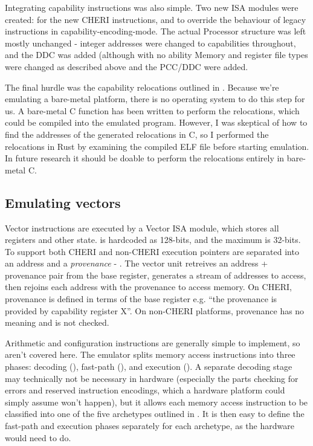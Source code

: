 
Integrating capability instructions was also simple.
Two new ISA modules were created:  for the new CHERI instructions, and  to override the behaviour of legacy instructions in capability-encoding-mode.
The actual Processor structure was left mostly unchanged - integer addresses were changed to capabilities throughout, and the DDC was added (although with no ability 
Memory and register file types were changed as described above and the PCC/DDC were added.

The final hurdle was the capability relocations outlined in .
Because we're emulating a bare-metal platform, there is no operating system to do this step for us.
A bare-metal C function has been written to perform the relocations, which could be compiled into the emulated program.
However, I was skeptical of how to find the addresses of the generated relocations in C, so I performed the relocations in Rust by examining the compiled ELF file before starting emulation.
In future research it should be doable to perform the relocations entirely in bare-metal C.

\subsection{Emulating vectors}

Vector instructions are executed by a Vector ISA module, which stores all registers and other state.
 is hardcoded as 128-bits, and the maximum  is  32-bits.
To support both CHERI and non-CHERI execution pointers are separated into an address and a \emph{provenance} - .
The vector unit retreives an address + provenance pair from the base register, generates a stream of addresses to access, then rejoins each address with the provenance to access memory.
On CHERI, provenance is defined in terms of the base register e.g. \enquote{the provenance is provided by capability register X}.
On non-CHERI platforms, provenance has no meaning and is not checked.

Arithmetic and configuration instructions are generally simple to implement, so aren't covered here.
The emulator splits memory access instructions into three phases: decoding (\todoref{}), fast-path (\todoref{}), and execution (\todoref{}).
A separate decoding stage may technically not be necessary in hardware (especially the parts checking for errors and reserved instruction encodings, which a hardware platform could simply assume won't happen), but it allows each memory access instruction to be classified into one of the five archetypes outlined in .
It is then easy to define the fast-path and execution phases separately for each archetype, as the hardware would need to do.

